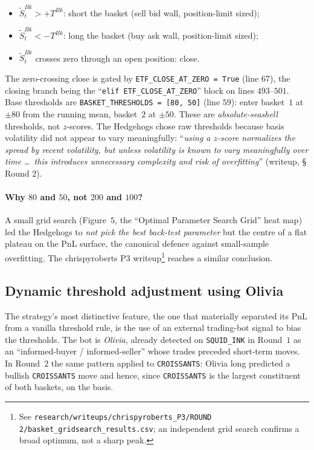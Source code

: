 \begin{itemize}
  \item $\tilde S^{Bk}_t > +T^{Bk}$: short the basket (sell bid
  wall, position-limit sized);
  \item $\tilde S^{Bk}_t < -T^{Bk}$: long the basket (buy ask
  wall, position-limit sized);
  \item $\tilde S^{Bk}_t$ crosses zero through an open position:
  close.
\end{itemize}

The zero-crossing close is gated by
\texttt{ETF\_CLOSE\_AT\_ZERO = True} (line $67$), the closing
branch being the ``\texttt{elif ETF\_CLOSE\_AT\_ZERO}'' block on
lines $493$--$501$. Base thresholds are
\texttt{BASKET\_THRESHOLDS = [80, 50]} (line $59$): enter
basket~$1$ at $\pm 80$ from the running mean, basket~$2$ at
$\pm 50$. These are \emph{absolute-seashell} thresholds, not $z$-scores.
The Hedgehogs chose raw thresholds because basis volatility did
not appear to vary meaningfully: ``\emph{using a $z$-score
normalizes the spread by recent volatility, but unless volatility
is known to vary meaningfully over time \ldots\ this introduces
unnecessary complexity and risk of overfitting}'' (writeup,
\S\,Round 2).

\paragraph{Why $80$ and $50$, not $200$ and $100$?} A small grid
search (Figure~$5$, the ``Optimal Parameter Search Grid'' heat map)
led the Hedgehogs to \emph{not pick the best back-test
parameter} but the centre of a flat plateau on the PnL surface,
the canonical defence against small-sample overfitting. The
chrispyroberts P3 writeup\footnote{See
\texttt{research/writeups/chrispyroberts\_P3/ROUND 2/basket\_gridsearch\_results.csv};
an independent grid search confirms a broad optimum, not a sharp
peak.} reaches a similar conclusion.

\subsection{Dynamic threshold adjustment using Olivia}
\label{sec:ch11_hh_olivia}

The strategy's most distinctive feature, the one that
materially separated its PnL from a vanilla threshold rule, is
the use of an external trading-bot signal to bias the thresholds.
The bot is \emph{Olivia}, already detected on \texttt{SQUID\_INK}
in Round~$1$ as an ``informed-buyer / informed-seller'' whose
trades preceded short-term moves. In Round~$2$ the same pattern
applied to \texttt{CROISSANTS}: Olivia long predicted a bullish
\texttt{CROISSANTS} move and hence, since \texttt{CROISSANTS} is
the largest constituent of both baskets, on the basis.

